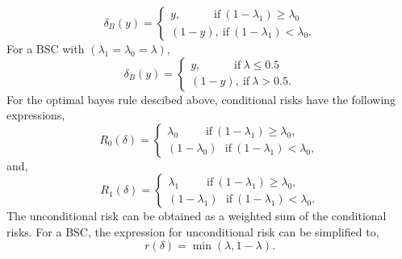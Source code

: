 \documentclass[a4paper,english,12pt]{article}
\begin{document}
\begin{exmp}
\begin{equation}
\delta_{B}(y)=\begin{cases}
y,\hspace{35pt}\mbox{if}~(1-\lambda_1)\geq\lambda_0\\
\left( 1-y\right), ~\mbox{if}~(1-\lambda_1)<\lambda_0.
\end{cases}
\end{equation}
For a BSC with $(\lambda_1=\lambda_0=\lambda)$,
\begin{equation}
\delta_{B}(y)=\begin{cases}
y,\hspace{35pt}\mbox{if}~\lambda\leq  0.5\\
\left( 1-y\right), ~\mbox{if}~\lambda>0.5.
\end{cases}
\end{equation}
For the optimal bayes rule descibed above, conditional risks have the following expressions,
\begin{equation}
R_0(\delta)=\begin{cases}
\lambda_0~~~~~~~~~~~\mbox{if}~(1-\lambda_1)\geq\lambda_0, \\
\left(1-\lambda_0\right)~~~\mbox{if}~(1-\lambda_1)<\lambda_0,
\end{cases}
\end{equation}
and,
\begin{equation}
R_1(\delta)=\begin{cases}
\lambda_1~~~~~~~~~~~\mbox{if}~(1-\lambda_1)\geq\lambda_0, \\
\left( 1-\lambda_1\right)~~~\mbox{if}~(1-\lambda_1)<\lambda_0.
\end{cases}
\end{equation}
The unconditional risk can be obtained as a weighted sum of the conditional risks. For a BSC, the expression for unconditional risk can be simplified to,
\begin{equation}
r(\delta)= \min\left( \lambda,1-\lambda\right).
\end{equation}
\end{exmp}
\end{document}
